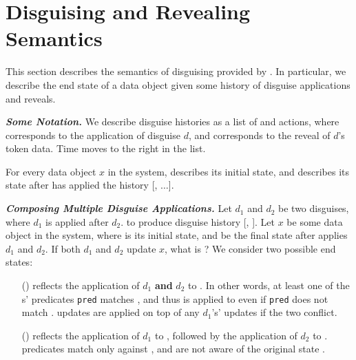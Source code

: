 \section{Disguising and Revealing Semantics}
\label{sec:comp}
This section describes the semantics of disguising provided by \sys. 
In particular, we describe the end state of a data object given some history of disguise
applications and reveals.

\vspace{6pt}\noindent\textbf{\emph{Some Notation.}} We describe disguise histories as a list of
 and  actions, where  corresponds to the application of disguise $d$, and
 corresponds to the reveal of $d$'s token data. Time moves to the right in the list.

For every data object $x$ in the system, \xstart describes its initial state, and
 describes its state after \sys has applied the history [,
$\dots$].


\vspace{6pt}\noindent\textbf{\emph{Composing Multiple Disguise Applications.}}
Let $d_1$ and $d_2$ be two disguises, where $d_1$ is applied after $d_2$.
to produce disguise history [, ]. 
%
Let $x$ be some data object in the system, where \xstart is its initial state, and
 be the final state after \sys applies $d_1$ and $d_2$.
%
If both $d_1$ and $d_2$ update $x$, what is ?
We consider two possible end states: 
%
\begin{enumerate}
\item[(\appcompone)]  reflects the application of $d_1$ \textbf{and} $d_2$ to \xstart. In other
words, at least one of the s' predicates \texttt{pred} matches \xstart, and thus  is
applied to \xhist[\app{d_1}] even if \texttt{pred} does not match \xhist[\app{d_1}]. 
 updates are applied on top of any $d_1$'s' updates if the two conflict.

\item[(\appcomptwo)]  reflects the application of $d_1$ to \xstart, followed
by the application of $d_2$ to \xhist{[\app{d_1}]}.  predicates match only against
\xhist{[\app{d_1}]}, and are not aware of the original state \xstart.
\end{enumerate}

